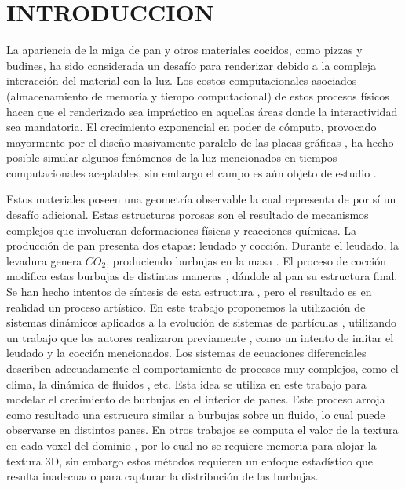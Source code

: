 \documentclass[oneside,a4paper,spanish,links]{amca}
\begin{document}
\section{INTRODUCCION}

La apariencia de la miga de pan y otros materiales cocidos, como pizzas y budines, ha sido considerada un desaf\'io para renderizar debido a la compleja interacci\'on del material con la luz. Los costos computacionales asociados (almacenamiento de memoria y tiempo computacional) de estos procesos f\'isicos hacen que el renderizado sea impr\'actico en aquellas áreas donde la interactividad sea mandatoria. El crecimiento exponencial en poder de c\'omputo, provocado mayormente por el dise\~no masivamente paralelo de las placas gr\'aficas \citep{Yeo09,Harris06}, ha hecho posible simular algunos fen\'omenos de la luz mencionados en tiempos computacionales aceptables, sin embargo el campo es a\'un objeto de estudio \citep{Voglsam2013}.

Estos materiales poseen una geometr\'ia observable la cual representa de por s\'i un desaf\'io adicional. Estas estructuras porosas son el resultado de mecanismos complejos que involucran deformaciones f\'isicas y reacciones qu\'imicas. La producci\'on de pan presenta dos etapas: leudado y cocci\'on. Durante el leudado, la levadura genera $CO_{2}$, produciendo burbujas en la masa \citep{Shah1998}. El proceso de cocci\'on \citep{Mondal2008} modifica estas burbujas de distintas maneras \citep{Scanlon2001}, d\'andole al pan su estructura final. Se han hecho intentos de s\'intesis de esta estructura \citep{Cho2007}, pero el resultado es en realidad un proceso art\'istico. En este trabajo proponemos la utilizaci\'on de sistemas din\'amicos \citep{Strogatz2001} aplicados a la evoluci\'on de sistemas de part\'iculas \citep{Reeves83}, utilizando un trabajo que los autores realizaron previamente \citep{Baravalle2011}, como un intento de imitar el leudado y la cocci\'on mencionados. Los sistemas de ecuaciones diferenciales describen adecuadamente el comportamiento de procesos muy complejos, como el clima, la dinámica de fluídos \citep{Stam1999}, etc. Esta idea se utiliza en este trabajo para modelar el crecimiento de burbujas en el interior de panes. Este proceso arroja como resultado una estrucura similar a burbujas sobre un fluido, lo cual puede observarse en distintos panes. En otros trabajos se computa el valor de la textura en cada voxel del dominio \citep{Perlin1989}, por lo cual no se requiere memoria para alojar la textura 3D, sin embargo estos m\'etodos requieren un enfoque estad\'istico que resulta inadecuado para capturar la distribuci\'on de las burbujas.
\end{document}
